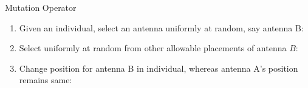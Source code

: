 \documentclass{beamer}
\begin{document}
\begin{frame}[t]{Mutation Operator}
    \begin{enumerate}
        \item Given an individual, select an antenna uniformly at random, say antenna B:\par
            \begin{minipage}[t]{\linewidth}
                \centering
            \end{minipage}
        \item Select uniformly at random from other allowable placements of antenna $B$: \par
            \begin{minipage}[t]{\linewidth}
                \centering
            \end{minipage}
        \item Change position for antenna B in individual, whereas antenna A's position remains same:\par
            \begin{minipage}[t]{\linewidth}
                \centering
            \end{minipage}
    \end{enumerate}
\end{frame}
\end{document}
